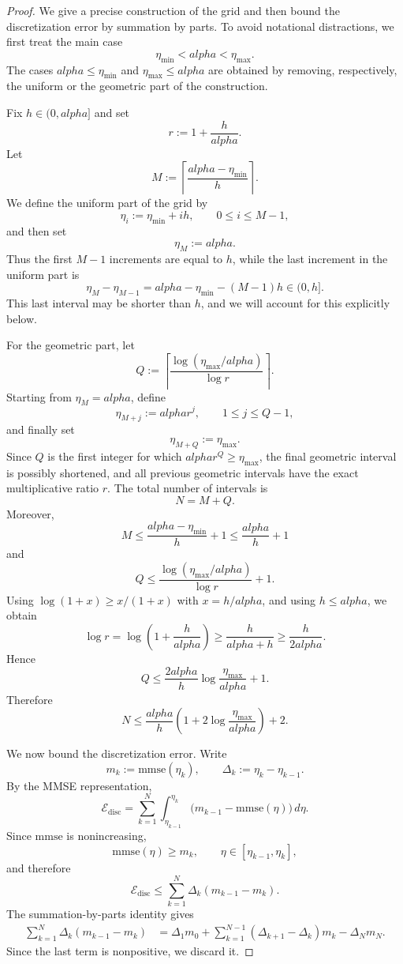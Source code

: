 \documentclass[11pt]{article}
\def\alpha{alpha}%
\newcommand{\mmse}{\mathrm{mmse}}
\begin{document}
\begin{proof}
We give a precise construction of the grid and then bound the discretization error by summation by parts. To avoid notational distractions, we first treat the main case
\[
    \eta_{\min}<\alpha<\eta_{\max}.
\]
The cases $\alpha\le \eta_{\min}$ and $\eta_{\max}\le\alpha$ are obtained by removing, respectively, the uniform or the geometric part of the construction.

Fix $h\in(0,\alpha]$ and set
\[
    r:=1+\frac{h}{\alpha}.
\]
Let
\[
    M:=\left\lceil \frac{\alpha-\eta_{\min}}{h}\right\rceil .
\]
We define the uniform part of the grid by
\[
    \eta_i:=\eta_{\min}+ih,
    \qquad
    0\le i\le M-1,
\]
and then set
\[
    \eta_M:=\alpha.
\]
Thus the first $M-1$ increments are equal to $h$, while the last increment in the uniform part is
\[
    \eta_M-\eta_{M-1}
    =
    \alpha-\eta_{\min}-(M-1)h
    \in(0,h].
\]
This last interval may be shorter than $h$, and we will account for this explicitly below.

For the geometric part, let
\[
    Q:=\left\lceil
    \frac{\log(\eta_{\max}/\alpha)}{\log r}
    \right\rceil .
\]
Starting from $\eta_M=\alpha$, define
\[
    \eta_{M+j}:=\alpha r^j,
    \qquad
    1\le j\le Q-1,
\]
and finally set
\[
    \eta_{M+Q}:=\eta_{\max}.
\]
Since $Q$ is the first integer for which $\alpha r^Q\ge \eta_{\max}$, the final geometric interval is possibly shortened, and all previous geometric intervals have the exact multiplicative ratio $r$. The total number of intervals is
\[
    N=M+Q .
\]
Moreover,
\[
    M\le \frac{\alpha-\eta_{\min}}{h}+1
    \le \frac{\alpha}{h}+1
\]
and
\[
    Q\le
    \frac{\log(\eta_{\max}/\alpha)}{\log r}+1 .
\]
Using $\log(1+x)\ge x/(1+x)$ with $x=h/\alpha$, and using $h\le \alpha$, we obtain
\[
    \log r
    =
    \log\left(1+\frac{h}{\alpha}\right)
    \ge
    \frac{h}{\alpha+h}
    \ge
    \frac{h}{2\alpha}.
\]
Hence
\[
    Q
    \le
    \frac{2\alpha}{h}
    \log\frac{\eta_{\max}}{\alpha}
    +1 .
\]
Therefore
\[
    N
    \le
    \frac{\alpha}{h}
    \left(
    1+2\log\frac{\eta_{\max}}{\alpha}
    \right)
    +2 .
\]

We now bound the discretization error. Write
\[
    m_k:=\mmse(\eta_k),
    \qquad
    \Delta_k:=\eta_k-\eta_{k-1}.
\]
By the MMSE representation,
\[
    \mathcal E_{\mathrm{disc}}
    =
    \sum_{k=1}^N
    \int_{\eta_{k-1}}^{\eta_k}
    \bigl(m_{k-1}-\mmse(\eta)\bigr)\,d\eta .
\]
Since $\mmse$ is nonincreasing,
\[
    \mmse(\eta)\ge m_k,
    \qquad
    \eta\in[\eta_{k-1},\eta_k],
\]
and therefore
\[
    \mathcal E_{\mathrm{disc}}
    \le
    \sum_{k=1}^N
    \Delta_k(m_{k-1}-m_k).
\]
The summation-by-parts identity gives
\[
\begin{aligned}
    \sum_{k=1}^N
    \Delta_k(m_{k-1}-m_k)
    &=
    \Delta_1m_0
    +
    \sum_{k=1}^{N-1}
    (\Delta_{k+1}-\Delta_k)m_k
    -
    \Delta_Nm_N .
\end{aligned}
\]
Since the last term is nonpositive, we discard it.


\end{proof}
\end{document}
